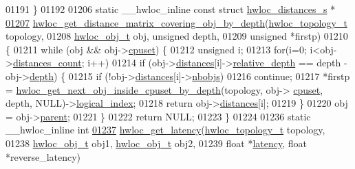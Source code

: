 \begin{DoxyCode}
01191 \}
01192 
01206 \textcolor{keyword}{static} \_\_hwloc\_inline \textcolor{keyword}{const} \textcolor{keyword}{struct }\hyperlink{a00014}{hwloc_distances_s} *
\hypertarget{a00031_source_l01207}{}\hyperlink{a00063_ga186ac2711b98a12cf46d58cd005fbb51}{01207} \hyperlink{a00063_ga186ac2711b98a12cf46d58cd005fbb51}{hwloc_get_distance_matrix_covering_obj_by_depth}(\hyperlink{a00039_ga9d1e76ee15a7dee158b786c30b6a6e38}{hwloc_topology_t} topology,
01208                                                 \hyperlink{a00016}{hwloc_obj_t} obj, \textcolor{keywordtype}{unsigned} depth,
01209                                                 \textcolor{keywordtype}{unsigned} *firstp)
01210 \{
01211   \textcolor{keywordflow}{while} (obj && obj->\hyperlink{a00016_a67925e0f2c47f50408fbdb9bddd0790f}{cpuset}) \{
01212     \textcolor{keywordtype}{unsigned} i;
01213     \textcolor{keywordflow}{for}(i=0; i<obj->\hyperlink{a00016_a8be6f63eca4da91000c832280db927b7}{distances_count}; i++)
01214       \textcolor{keywordflow}{if} (obj->\hyperlink{a00016_a9a5dd75596edc48fe834f81988cdc0d6}{distances}[i]->\hyperlink{a00014_a6fe066eaf62ee448aa05bab8e7217ff7}{relative_depth} == depth - obj->\hyperlink{a00016_a9d82690370275d42d652eccdea5d3ee5}{depth}) \{
01215         \textcolor{keywordflow}{if} (!obj->\hyperlink{a00016_a9a5dd75596edc48fe834f81988cdc0d6}{distances}[i]->\hyperlink{a00014_a4ca2af858cebbce7324ec49903d09474}{nbobjs})
01216           \textcolor{keywordflow}{continue};
01217         *firstp = \hyperlink{a00054_ga8af256c2572f16520f95440b884c1bd6}{hwloc_get_next_obj_inside_cpuset_by_depth}(topology, obj->
      \hyperlink{a00016_a67925e0f2c47f50408fbdb9bddd0790f}{cpuset}, depth, NULL)->\hyperlink{a00016_a0d07fb7b8935e137c94d75a3eb492ae9}{logical_index};
01218         \textcolor{keywordflow}{return} obj->\hyperlink{a00016_a9a5dd75596edc48fe834f81988cdc0d6}{distances}[i];
01219       \}
01220     obj = obj->\hyperlink{a00016_adc494f6aed939992be1c55cca5822900}{parent};
01221   \}
01222   \textcolor{keywordflow}{return} NULL;
01223 \}
01224 
01236 \textcolor{keyword}{static} \_\_hwloc\_inline \textcolor{keywordtype}{int}
\hypertarget{a00031_source_l01237}{}\hyperlink{a00063_ga9addde99e34b815df47625f1d6191839}{01237} \hyperlink{a00063_ga9addde99e34b815df47625f1d6191839}{hwloc_get_latency}(\hyperlink{a00039_ga9d1e76ee15a7dee158b786c30b6a6e38}{hwloc_topology_t} topology,
01238                    \hyperlink{a00016}{hwloc_obj_t} obj1, \hyperlink{a00016}{hwloc_obj_t} obj2,
01239                    \textcolor{keywordtype}{float} *\hyperlink{a00014_a0f70f48d1bfb18e5e2008825da2967c9}{latency}, \textcolor{keywordtype}{float} *reverse\_latency)

\end{DoxyCode}
